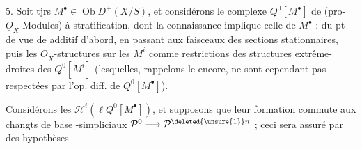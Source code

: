 5. Soit tjrs $M^\bullet\in\operatorname{Ob}D^+(X/S)$, et considérons le complexe $Q^0[M^\bullet]$  \deleted{\unsure{de $Q^0[$}} de (pro-$\underline O_X$-Modules) à stratification, dont la connaissance implique celle de $M^\bullet$ : du pt de vue de  additif d'abord, en passant aux faisceaux des sections stationnaires, puis les $\underline O_X$-structures sur les $M^i$ comme restrictions des structures extrême-droites des $Q^0[M^i]$ (lesquelles, rappelons le encore, ne sont cependant pas respectées par l'op. diff. de $Q^0[M^\bullet]$).

Considérons les $\mathcal H^i(\ell Q^0[M^\bullet])$, et supposons que leur formation commute aux changts de base -simpliciaux $\mathcal P^0\longrightarrow\mathcal P^{\deleted{\unsure{1}}n}$ ; ceci sera assuré par des hypothèses
